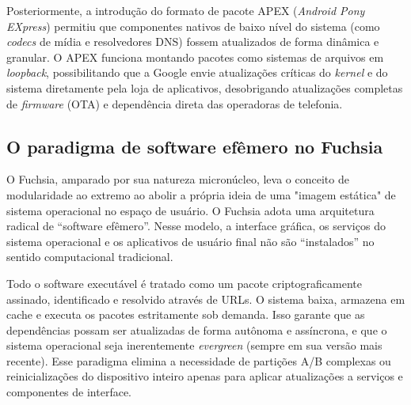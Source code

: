 \documentclass[12pt,a4paper]{article}
\begin{document}
Posteriormente, a introdução do formato de pacote APEX (\emph{Android Pony
EXpress}) permitiu que componentes nativos de baixo nível do sistema (como
\emph{codecs} de mídia e resolvedores DNS) fossem atualizados de forma dinâmica
e granular. O APEX funciona montando pacotes como sistemas de arquivos em
\emph{loopback}, possibilitando que a Google envie atualizações críticas do
\emph{kernel} e do sistema diretamente pela loja de aplicativos, desobrigando
atualizações completas de \emph{firmware} (OTA) e dependência direta das
operadoras de telefonia.

\subsection{O paradigma de software efêmero no Fuchsia}

O Fuchsia, amparado por sua natureza micronúcleo, leva o conceito de
modularidade ao extremo ao abolir a própria ideia de uma "imagem estática" de
sistema operacional no espaço de usuário. O Fuchsia adota uma arquitetura
radical de ``software efêmero''. Nesse modelo, a interface gráfica, os serviços
do sistema operacional e os aplicativos de usuário final não são ``instalados''
no sentido computacional tradicional.

Todo o software executável é tratado como um pacote criptograficamente assinado,
identificado e resolvido através de URLs. O sistema baixa, armazena em cache e
executa os pacotes estritamente sob demanda. Isso garante que as dependências
possam ser atualizadas de forma autônoma e assíncrona, e que o sistema
operacional seja inerentemente \emph{evergreen} (sempre em sua versão mais
recente). Esse paradigma elimina a necessidade de partições A/B complexas ou
reinicializações do dispositivo inteiro apenas para aplicar atualizações a
serviços e componentes de interface.

\newpage


\end{document}
